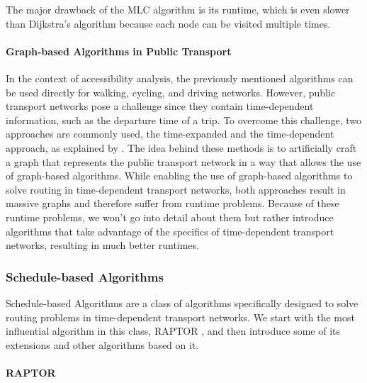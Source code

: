 The major drawback of the MLC algorithm is its runtime, which is even slower than Dijkstra's algorithm because each node can be visited multiple times.


\paragraph{Graph-based Algorithms in Public Transport}
\label{subsubsec:graph_based_algorithms_in_public_transport}


In the context of accessibility analysis, the previously mentioned algorithms can be used directly for walking, cycling, and driving networks.
However, public transport networks pose a challenge since they contain time-dependent information, such as the departure time of a trip.
To overcome this challenge, two approaches are commonly used, the time-expanded and the time-dependent approach, as explained by .
The idea behind these methods is to artificially craft a graph that represents the public transport network in a way that allows the use of graph-based algorithms.
While enabling the use of graph-based algorithms to solve routing in time-dependent transport networks, both approaches result in massive graphs and therefore suffer from runtime problems. 
Because of these runtime problems, we won't go into detail about them but rather introduce algorithms that take advantage of the specifics of time-dependent transport networks, resulting in much better runtimes.

\subsubsection{Schedule-based Algorithms}

Schedule-based Algorithms are a class of algorithms specifically designed to solve routing problems in time-dependent transport networks.
We start with the most influential algorithm in this class, RAPTOR , and then introduce some of its extensions and other algorithms based on it.

\paragraph{RAPTOR}
\label{subsubsec:raptor}

